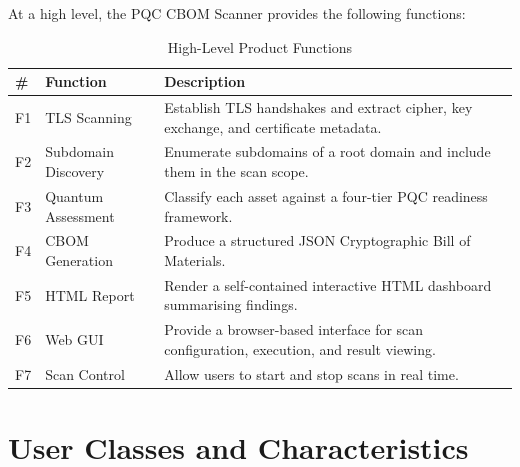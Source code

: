 At a high level, the PQC CBOM Scanner provides the following functions:

\begin{table}[H]
  \centering
  \caption{High-Level Product Functions}
  \label{tab:product_functions}
  \begin{tabularx}{\textwidth}{C{0.5cm} L{4cm} L{9.5cm}}
    \toprule
    \textbf{\#} & \textbf{Function} & \textbf{Description} \\
    \midrule
    F1 & TLS Scanning        & Establish TLS handshakes and extract cipher,
                               key exchange, and certificate metadata. \\
    F2 & Subdomain Discovery & Enumerate subdomains of a root domain and
                               include them in the scan scope. \\
    F3 & Quantum Assessment  & Classify each asset against a four-tier PQC
                               readiness framework. \\
    F4 & CBOM Generation     & Produce a structured JSON Cryptographic Bill
                               of Materials. \\
    F5 & HTML Report         & Render a self-contained interactive HTML
                               dashboard summarising findings. \\
    F6 & Web GUI             & Provide a browser-based interface for scan
                               configuration, execution, and result viewing. \\
    F7 & Scan Control        & Allow users to start and stop scans in real time. \\
    \bottomrule
  \end{tabularx}
\end{table}

\section{User Classes and Characteristics}
\label{sec:user_classes}


